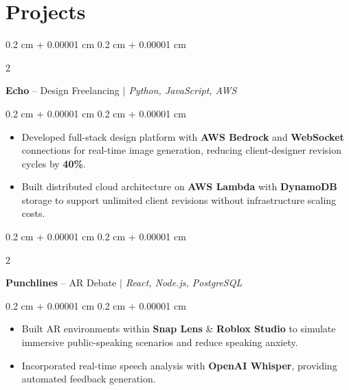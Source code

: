 \documentclass[10pt, letterpaper]{article}
\newenvironment{highlights}{
    \begin{itemize}[
        topsep=0.10 cm,
        parsep=0.10 cm,
        partopsep=0pt,
        itemsep=0pt,
        leftmargin=0.4 cm + 10pt
    ]
}{
    \end{itemize}
} %
\newenvironment{onecolentry}{
    \begin{adjustwidth}{
        0.2 cm + 0.00001 cm
    }{
        0.2 cm + 0.00001 cm
    }
}{
    \end{adjustwidth}
} %
\newenvironment{twocolentry}[2][]{
    \onecolentry
    \def\secondColumn{#2}
    \setcolumnwidth{\fill, 5 cm}
    \begin{paracol}{2}
}{
    \switchcolumn \raggedleft \secondColumn
    \end{paracol}
    \endonecolentry
} %
\let\hrefWithoutArrow\href
\renewcommand{\href}[2]{\hrefWithoutArrow{#1}{\ifthenelse{\equal{#2}{}}{ }{#2 }\raisebox{.15ex}{\footnotesize \faExternalLink*}}}
\begin{document}
    
    \section{Projects}
        
        \begin{twocolentry}{}
            \textbf{Echo} -- Design Freelancing \textit{ $|$ Python, JavaScript, AWS}
        \end{twocolentry}

        \vspace{0.10 cm}
        \begin{onecolentry}
            \begin{highlights}
                \item Developed full-stack design platform with \textbf{AWS Bedrock} and \textbf{WebSocket} connections for real-time image generation, reducing client-designer revision cycles by \textbf{40\%}.
                \item Built distributed cloud architecture on \textbf{AWS Lambda} with \textbf{DynamoDB} storage to support unlimited client revisions without infrastructure scaling costs.
            \end{highlights}
        \end{onecolentry}


        \vspace{0.3 cm}

        \begin{twocolentry}{}
            \textbf{Punchlines} -- AR Debate \textit{ $|$ React, Node.js, PostgreSQL}
        \end{twocolentry}

        \vspace{0.10 cm}
        \begin{onecolentry}
            \begin{highlights}
                \item Built AR environments within \textbf{Snap Lens} \& \textbf{Roblox Studio} to simulate immersive public-speaking scenarios and reduce speaking anxiety.
                \item Incorporated real-time speech analysis with \textbf{OpenAI Whisper}, providing automated feedback generation.
            \end{highlights}
        \end{onecolentry}
\end{document}
